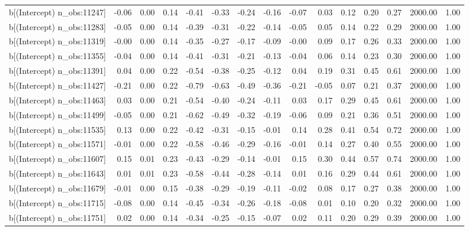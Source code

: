 \begin{table}[ht]
\begin{tabular}{rrrrrrrrrrrrrrr}
  b[(Intercept) n\_obs:11247] & -0.06 & 0.00 & 0.14 & -0.41 & -0.33 & -0.24 & -0.16 & -0.07 & 0.03 & 0.12 & 0.20 & 0.27 & 2000.00 & 1.00 \\ 
  b[(Intercept) n\_obs:11283] & -0.05 & 0.00 & 0.14 & -0.39 & -0.31 & -0.22 & -0.14 & -0.05 & 0.05 & 0.14 & 0.22 & 0.29 & 2000.00 & 1.00 \\ 
  b[(Intercept) n\_obs:11319] & -0.00 & 0.00 & 0.14 & -0.35 & -0.27 & -0.17 & -0.09 & -0.00 & 0.09 & 0.17 & 0.26 & 0.33 & 2000.00 & 1.00 \\ 
  b[(Intercept) n\_obs:11355] & -0.04 & 0.00 & 0.14 & -0.41 & -0.31 & -0.21 & -0.13 & -0.04 & 0.06 & 0.14 & 0.23 & 0.30 & 2000.00 & 1.00 \\ 
  b[(Intercept) n\_obs:11391] & 0.04 & 0.00 & 0.22 & -0.54 & -0.38 & -0.25 & -0.12 & 0.04 & 0.19 & 0.31 & 0.45 & 0.61 & 2000.00 & 1.00 \\ 
  b[(Intercept) n\_obs:11427] & -0.21 & 0.00 & 0.22 & -0.79 & -0.63 & -0.49 & -0.36 & -0.21 & -0.05 & 0.07 & 0.21 & 0.37 & 2000.00 & 1.00 \\ 
  b[(Intercept) n\_obs:11463] & 0.03 & 0.00 & 0.21 & -0.54 & -0.40 & -0.24 & -0.11 & 0.03 & 0.17 & 0.29 & 0.45 & 0.61 & 2000.00 & 1.00 \\ 
  b[(Intercept) n\_obs:11499] & -0.05 & 0.00 & 0.21 & -0.62 & -0.49 & -0.32 & -0.19 & -0.06 & 0.09 & 0.21 & 0.36 & 0.51 & 2000.00 & 1.00 \\ 
  b[(Intercept) n\_obs:11535] & 0.13 & 0.00 & 0.22 & -0.42 & -0.31 & -0.15 & -0.01 & 0.14 & 0.28 & 0.41 & 0.54 & 0.72 & 2000.00 & 1.00 \\ 
  b[(Intercept) n\_obs:11571] & -0.01 & 0.00 & 0.22 & -0.58 & -0.46 & -0.29 & -0.16 & -0.01 & 0.14 & 0.27 & 0.40 & 0.55 & 2000.00 & 1.00 \\ 
  b[(Intercept) n\_obs:11607] & 0.15 & 0.01 & 0.23 & -0.43 & -0.29 & -0.14 & -0.01 & 0.15 & 0.30 & 0.44 & 0.57 & 0.74 & 2000.00 & 1.00 \\ 
  b[(Intercept) n\_obs:11643] & 0.01 & 0.01 & 0.23 & -0.58 & -0.44 & -0.28 & -0.14 & 0.01 & 0.16 & 0.29 & 0.44 & 0.61 & 2000.00 & 1.00 \\ 
  b[(Intercept) n\_obs:11679] & -0.01 & 0.00 & 0.15 & -0.38 & -0.29 & -0.19 & -0.11 & -0.02 & 0.08 & 0.17 & 0.27 & 0.38 & 2000.00 & 1.00 \\ 
  b[(Intercept) n\_obs:11715] & -0.08 & 0.00 & 0.14 & -0.45 & -0.34 & -0.26 & -0.18 & -0.08 & 0.01 & 0.10 & 0.20 & 0.32 & 2000.00 & 1.00 \\ 
  b[(Intercept) n\_obs:11751] & 0.02 & 0.00 & 0.14 & -0.34 & -0.25 & -0.15 & -0.07 & 0.02 & 0.11 & 0.20 & 0.29 & 0.39 & 2000.00 & 1.00 \\ 

\end{tabular}
\end{table}
